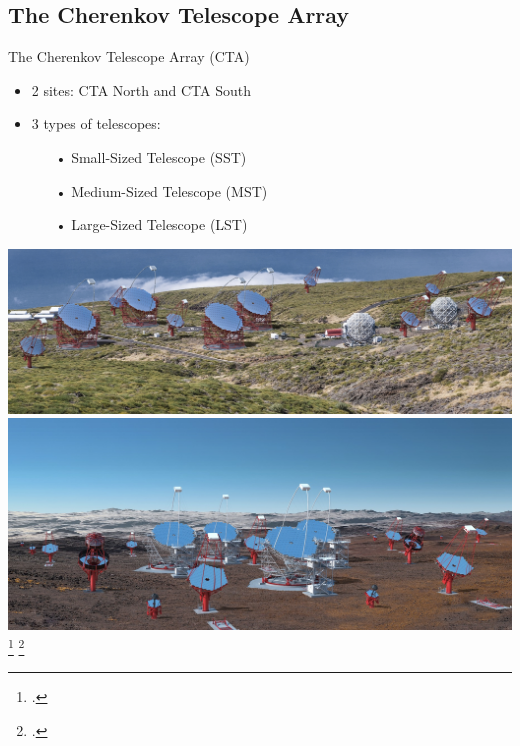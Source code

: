 \subsection{The Cherenkov Telescope Array}

\begin{frame}{The Cherenkov Telescope Array (CTA)}
  \begin{minipage}{0.48\textwidth}
    \begin{itemize}
      \setlength\itemsep{1em}
      \item 2 sites: CTA North and CTA South
      \item 3 types of telescopes:
      \begin{itemize}
        \setlength\itemsep{0.5em}
        \item [•] Small-Sized Telescope (SST)
        \item [•] Medium-Sized Telescope (MST)
        \item [•] Large-Sized Telescope (LST)
      \end{itemize}
    \end{itemize}
  \end{minipage}
  \begin{minipage}{0.48\textwidth}
    \begin{center}
      \includegraphics[width=\textwidth]{graphics/cta_north_render.jpg}
      \includegraphics[width=\textwidth]{graphics/cta_south_render.jpg}
      \ifdefined\darktheme
        \footcite[\textcolor{white!85!black}{Image Credit:}][]{perezdiaz}
      \else
        \footcite[\textcolor{darkgray!85!black}{Image Credit:}][]{perezdiaz}
      \fi
    \end{center}
  \end{minipage}
\end{frame}


